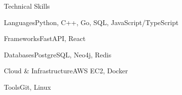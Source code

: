 \documentclass[
	11pt
]{../../../template}
\begin{document}
	\begin{rSection}{T}{echnical Skills}
		\begin{rSet}{Languages}{Python, C++, Go, SQL, JavaScript/TypeScript}
		\end{rSet}
		\begin{rSet}{Frameworks}{FastAPI, React}
		\end{rSet}
		\begin{rSet}{Databases}{PostgreSQL, Neo4j, Redis}
		\end{rSet}
		\begin{rSet}{Cloud \& Infrastructure}{AWS EC2, Docker}
		\end{rSet}
		\begin{rSet}{Tools}{Git, Linux}
		\end{rSet}
	\end{rSection}
\end{document}
